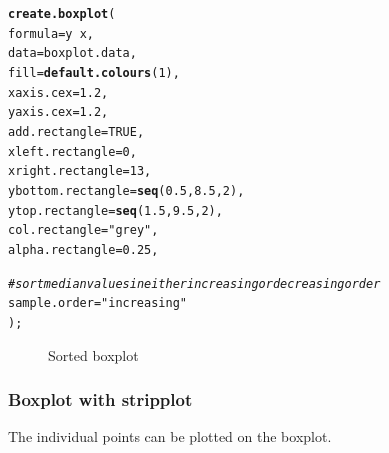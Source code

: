 \documentclass[letterpaper]{report}\usepackage[]{graphicx}\usepackage[]{color}
\makeatletter
\newcommand{\hlnum}[1]{\textcolor[rgb]{0.686,0.059,0.569}{#1}}%
\newcommand{\hlstr}[1]{\textcolor[rgb]{0.192,0.494,0.8}{#1}}%
\newcommand{\hlcom}[1]{\textcolor[rgb]{0.678,0.584,0.686}{\textit{#1}}}%
\newcommand{\hlopt}[1]{\textcolor[rgb]{0,0,0}{#1}}%
\newcommand{\hlstd}[1]{\textcolor[rgb]{0.345,0.345,0.345}{#1}}%
\newcommand{\hlkwc}[1]{\textcolor[rgb]{0.333,0.667,0.333}{#1}}%
\newcommand{\hlkwd}[1]{\textcolor[rgb]{0.737,0.353,0.396}{\textbf{#1}}}%
\newenvironment{kframe}{%
 \def\at@end@of@kframe{}%
 \ifinner\ifhmode%
  \def\at@end@of@kframe{\end{minipage}}%
  \begin{minipage}{\columnwidth}%
 \fi\fi%
 \def\FrameCommand##1{\hskip\@totalleftmargin \hskip-\fboxsep
 \colorbox{shadecolor}{##1}\hskip-\fboxsep
     \hskip-\linewidth \hskip-\@totalleftmargin \hskip\columnwidth}%
 \MakeFramed {\advance\hsize-\width
   \@totalleftmargin\z@ \linewidth\hsize
   \@setminipage}}%
 {\par\unskip\endMakeFramed%
 \at@end@of@kframe}
\newenvironment{knitrout}{}{} %
\makeatother
\begin{document}
\begin{knitrout}
\color{fgcolor}\begin{kframe}
\begin{alltt}
\hlkwd{create.boxplot}\hlstd{(}
    \hlkwc{formula} \hlstd{= y} \hlopt{~} \hlstd{x,}
    \hlkwc{data} \hlstd{= boxplot.data,}
    \hlkwc{fill} \hlstd{=} \hlkwd{default.colours}\hlstd{(}\hlnum{1}\hlstd{),}
    \hlkwc{xaxis.cex} \hlstd{=} \hlnum{1.2}\hlstd{,}
    \hlkwc{yaxis.cex} \hlstd{=} \hlnum{1.2}\hlstd{,}
    \hlkwc{add.rectangle} \hlstd{=} \hlnum{TRUE}\hlstd{,}
    \hlkwc{xleft.rectangle} \hlstd{=} \hlnum{0}\hlstd{,}
    \hlkwc{xright.rectangle} \hlstd{=} \hlnum{13}\hlstd{,}
    \hlkwc{ybottom.rectangle} \hlstd{=} \hlkwd{seq}\hlstd{(}\hlnum{0.5}\hlstd{,} \hlnum{8.5}\hlstd{,} \hlnum{2}\hlstd{),}
    \hlkwc{ytop.rectangle} \hlstd{=} \hlkwd{seq}\hlstd{(}\hlnum{1.5}\hlstd{,} \hlnum{9.5}\hlstd{,} \hlnum{2}\hlstd{),}
    \hlkwc{col.rectangle} \hlstd{=} \hlstr{"grey"}\hlstd{,}
    \hlkwc{alpha.rectangle} \hlstd{=} \hlnum{0.25}\hlstd{,}

    \hlcom{# sort median values in either increasing or decreasing order}
    \hlkwc{sample.order} \hlstd{=} \hlstr{"increasing"}
    \hlstd{);}
\end{alltt}
\end{kframe}\begin{figure}

{\centering {} 

}

\caption[Sorted boxplot]{Sorted boxplot\label{fig:boxplot4}}
\end{figure}


\end{knitrout}

\subsubsection{Boxplot with stripplot}
The individual points can be plotted on the boxplot.
\end{document}
